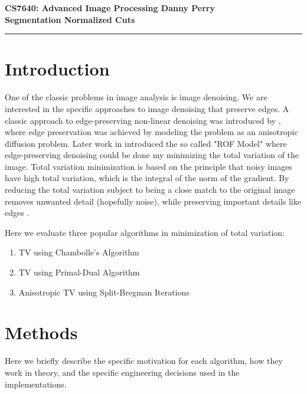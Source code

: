 \documentclass[11pt]{article}
\begin{document}
\thispagestyle{empty}
{\large{\bf CS7640: Advanced Image Processing \hfill Danny Perry}}\\

{\LARGE{\bf Segmentation Normalized Cuts}}
\vspace{0.2\baselineskip}
\hrule

\section{Introduction}
One of the classic problems in image analysis is image denoising.
We are interested in the specific approaches to image denoising that preserve edges.
A classic approach to edge-preserving non-linear denoising was introduced by \cite{perona1990scale}, where edge preservation was achieved by modeling the problem as an anisotropic diffusion problem.
Later work in \cite{rudin1992nonlinear} introduced the so called "ROF Model" where edge-preserving denoising could be done my minimizing the total variation of the image.
Total variation minimization is based on the principle that noisy images have high total variation, which is the integral of the norm of the gradient.  
By reducing the total variation subject to being a close match to the original image removes unwanted detail (hopefully noise), while preserving important details like edges \cite{wikiTV}.

Here we evaluate three popular algorithms in minimization of total variation:
\begin{enumerate}
\item TV using Chambolle's Algorithm
\item TV using Primal-Dual Algorithm
\item Anisotropic TV using Split-Bregman Iterations
\end{enumerate}

\section{Methods}
Here we briefly describe the specific motivation for each algorithm, how they work in theory, and the specific engineering decisions used in the implementations.
\end{document}
